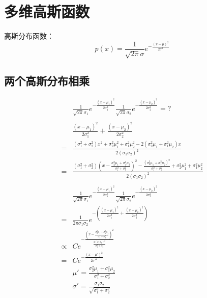 \section{多维高斯函数}

高斯分布函数：
\begin{equation}
p(x) = \frac{1}{\sqrt{2\pi}\sigma}e^{-\frac{(x-\mu)^2}{2\sigma^2}}
\end{equation}

\subsection{两个高斯分布相乘}
\begin{align}
    &\frac{1}{\sqrt{2\pi}\sigma_{1}}e^{-\frac{(x-\mu_{1})^2}{2\sigma_{1}^2}}
    \frac{1}{\sqrt{2\pi}\sigma_{2}}e^{-\frac{(x-\mu_{2})^2}{2\sigma_{2}^2}}=?\\
    \\
    &\frac{(x-\mu_{1})^2}{2\sigma_{1}^2} + \frac{(x-\mu_{2})^2}{2\sigma_{2}^2}\\
    =& \frac{(\sigma_{1}^2+\sigma_{2}^2)x^2+\sigma_{2}^2\mu_{1}^2+\sigma_{1}^2\mu_{2}^2-2(\sigma_{2}^2\mu_{1}+\sigma_{1}^2\mu_{2})x}{2(\sigma_{1}\sigma_{2})^2}\\
    =& \frac{(\sigma_{1}^2+\sigma_{2}^2)(x-\frac{\sigma_{2}^2\mu_{1}+\sigma_{1}^2\mu_{2}}{\sigma_{1}^2+\sigma_{2}^2})^2- \frac{(\sigma_{2}^2\mu_{1}+\sigma_{1}^2\mu_{2})^2}{\sigma_{1}^2+\sigma_{2}^2} +\sigma_{2}^2\mu_{1}^2+\sigma_{1}^2\mu_{2}^2}{2(\sigma_{1}\sigma_{2})^2}\\
    \\
    &\frac{1}{\sqrt{2\pi}\sigma_{1}}e^{-\frac{(x-\mu_{1})^2}{2\sigma_{1}^2}}
    \frac{1}{\sqrt{2\pi}\sigma_{2}}e^{-\frac{(x-\mu_{2})^2}{2\sigma_{2}^2}}\\
    =& \frac{1}{2\pi\sigma_{1}\sigma_{2}}e^{-(\frac{(x-\mu_{1})^2}{2\sigma_{1}^2} + \frac{(x-\mu_{2})^2}{2\sigma_{2}^2})}\\
    \propto & Ce^{-\frac{(x-\frac{\sigma_{2}^2\mu_{1}+\sigma_{1}^2\mu_{2}}{\sigma_{1}^2+\sigma_{2}^2})^2}{\frac{2(\sigma_{1}\sigma_{2})^2}{\sigma_{1}^2+\sigma_{2}^2}}}\\
    =& Ce^{-\frac{(x-\mu')^2}{2\sigma'^{2}}}\\
    &\mu'=\frac{\sigma_{2}^2\mu_{1}+\sigma_{1}^2\mu_{2}}{\sigma_{1}^2+\sigma_{2}^2}\\
    &\sigma'=\frac{\sigma_{1}\sigma_{2}}{\sqrt{\sigma_{1}^2+\sigma_{2}^2}}
\end{align}

